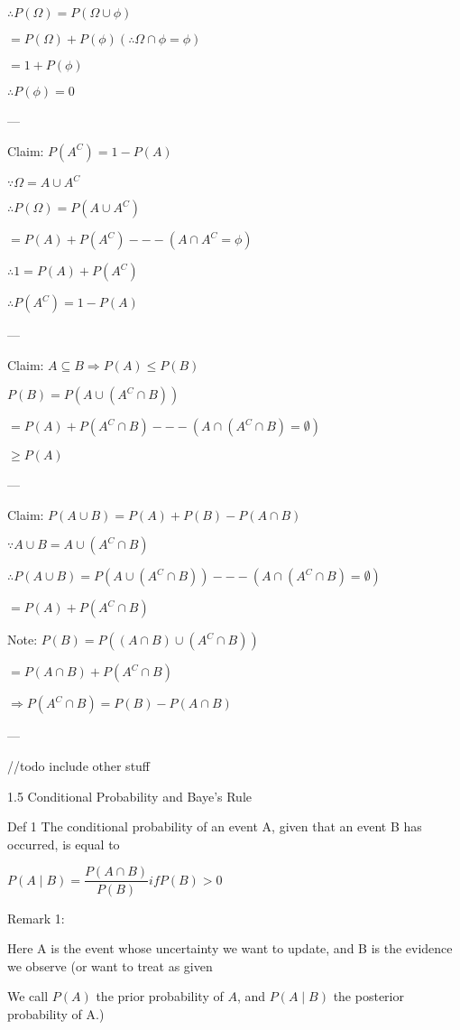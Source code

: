 \documentclass[12 pt]{article}
\begin{document}
\(\therefore P(\Omega) = P(\Omega \cup \phi)\)

\(= P(\Omega) + P(\phi) (\therefore \Omega \cap \phi = \phi)\)

\(= 1+ P(\phi)\)

\(\therefore P(\phi) = 0\)

---

Claim: \(P(A^C) = 1 - P(A)\)

\(\because \Omega = A \cup A^C\)

\(\therefore P(\Omega) = P(A \cup A^C)\)

\(= P(A) + P(A^C) --- (A \cap A^C = \phi)\)

\(\therefore 1 = P(A) + P(A^C)\)

\(\therefore P(A^C) = 1 - P(A)\)

---

Claim: \(A \subseteq B \Rightarrow P(A) \le P(B)\)

\(P(B) = P(A \cup (A^C \cap B))\)

\(= P(A) + P(A^C \cap B) --- (A \cap (A^C \cap B) = \emptyset)\)

\(\ge P(A)\)

---

Claim: \(P(A \cup B) = P(A) + P(B) - P(A \cap B)\)

\(\because A \cup B = A \cup (A^C \cap B)\)

\(\therefore P(A \cup B) = P(A \cup (A^C \cap B)) --- (A \cap (A^C \cap B) = \emptyset)\)

\(= P(A) + P(A^C \cap B)\)

Note: \(P(B) = P((A \cap B) \cup (A^C \cap B))\)

\(= P(A \cap B) + P(A^C \cap B)\)

\(\Rightarrow P(A^C \cap B) = P(B) - P(A \cap B)\)

---

//todo include other stuff

1.5 Conditional Probability and Baye's Rule

Def 1 The conditional probability of an event A, given that an event B has occurred, is equal to

\(P(A \mid B) = \dfrac{P(A \cap B)}{P(B)} if P(B) > 0\)

Remark 1:

Here A is the event whose uncertainty we want to update, and B is the evidence we observe (or want to treat as given

We call \(P(A)\) the prior probability of \(A\), and \(P(A \mid B)\) the posterior probability of A.)
\end{document}
